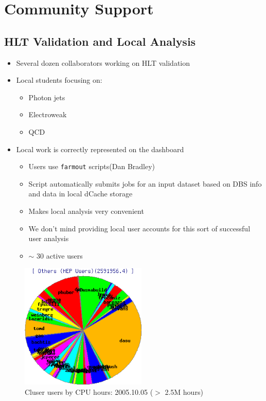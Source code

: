 \documentclass{beamer}
\newcommand{\ca}{\ensuremath{\sim}}
\begin{document}
\section{Community Support}
\subsection{HLT Validation and Local Analysis}
\begin{frame}
\begin{itemize}
    \item Several dozen collaborators working on HLT validation
    \item Local students focusing on:
    \begin{itemize}
        \item Photon jets
        \item Electroweak
        \item QCD
    \end{itemize}
    \item Local work is correctly represented on the dashboard
    \begin{itemize}
        \item Users use {\tt farmout} scripts\footnotemark[1] (Dan Bradley)
        \item Script automatically submits jobs for an input dataset based on DBS info and data in local dCache storage
        \item Makes local analysis very convenient
        \item We don't mind providing local user accounts for this sort of successful user analysis
        \item \ca{} 30 active users
    \end{itemize}
\end{itemize}
\end{frame}

\begin{frame}
\begin{figure}
    \includegraphics[height=6cm]{Graphics/glow-userpie.png}
    \caption{Cluser users by CPU hours: 2005.10.05 ($>$ 2.5M hours)}
\end{figure}
\end{frame}
\end{document}
